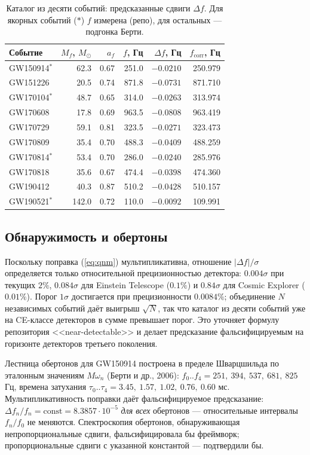 \documentclass[11pt,a4paper]{article}
\begin{document}
\begin{table}[htbp]
\centering\small
\caption{Каталог из десяти событий: предсказанные сдвиги $\Delta f$.
Для якорных событий ($\ast$) $f$ измерена (репо), для остальных --- подгонка
Берти.}
\label{tab:qnm}
\begin{tabular}{lrrrrr}
\toprule
Событие & $M_f$, $M_\odot$ & $a_f$ & $f$, Гц & $\Delta f$, Гц & $f_{\mathrm{corr}}$, Гц \\
\midrule
GW150914$^*$ & 62.3 & 0.67 & 251.0 & $-0.0210$ & 250.979 \\
GW151226 & 20.5 & 0.74 & 871.8 & $-0.0731$ & 871.710 \\
GW170104$^*$ & 48.7 & 0.65 & 314.0 & $-0.0263$ & 313.974 \\
GW170608 & 17.8 & 0.69 & 963.5 & $-0.0808$ & 963.419 \\
GW170729 & 59.1 & 0.81 & 323.5 & $-0.0271$ & 323.473 \\
GW170809 & 35.4 & 0.70 & 488.3 & $-0.0409$ & 488.259 \\
GW170814$^*$ & 53.4 & 0.70 & 286.0 & $-0.0240$ & 285.976 \\
GW170818 & 35.6 & 0.67 & 474.4 & $-0.0398$ & 474.360 \\
GW190412 & 40.3 & 0.87 & 510.2 & $-0.0428$ & 510.157 \\
GW190521$^*$ & 142.0 & 0.72 & 110.0 & $-0.0092$ & 109.991 \\
\bottomrule
\end{tabular}
\end{table}

\subsection{Обнаружимость и обертоны}

Поскольку поправка (\ref{eq:qnm}) мультипликативна, отношение $|\Delta f|/\sigma$
определяется только относительной прецизионностью детектора: $0.004\sigma$ при
текущих $2\%$, $0.084\sigma$ для Einstein Telescope ($0.1\%$) и $0.84\sigma$
для Cosmic Explorer ($0.01\%$). Порог $1\sigma$ достигается при прецизионности
$0.0084\%$; объединение $N$ независимых событий даёт выигрыш $\sqrt{N}$, так
что каталог из десяти событий уже на CE-классе детекторов в сумме превышает
порог. Это уточняет формулу репозитория <<near-detectable>> и делает предсказание
фальсифицируемым на горизонте детекторов третьего поколения.

Лестница обертонов для GW150914 построена в пределе Шварцшильда по эталонным
значениям $M\omega_n$ (Берти и др., 2006): $f_0..f_4 = 251,\ 394,\ 537,\ 681,\
825$ Гц, времена затухания $\tau_0..\tau_4 = 3.45,\ 1.57,\ 1.02,\ 0.76,\
0.60$ мс. Мультипликативность поправки даёт фальсифицируемое предсказание:
$\Delta f_n / f_n = \mathrm{const} = 8.3857\cdot10^{-5}$ \emph{для всех}
обертонов --- относительные интервалы $f_n/f_0$ не меняются. Спектроскопия
обертонов, обнаруживающая непропорциональные сдвиги, фальсифицировала бы
фреймворк; пропорциональные сдвиги с указанной константой --- подтвердили бы.
\end{document}
